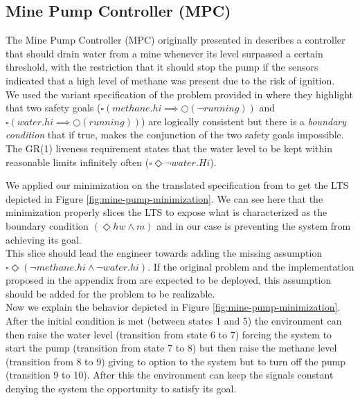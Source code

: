 \subsection{Mine Pump Controller (MPC)}
The Mine Pump Controller (MPC)
 originally presented in
\cite{:/content/journals/10.1049/ip-e.1983.0001} describes a controller that should
drain water from a mine whenever its level surpassed
a certain threshold, with the restriction that it should
stop the pump if the sensors indicated that a high level
of methane was present due to the risk of ignition.\\

We used the variant specification of the problem provided  in \cite{DBLP:conf/kbse/DegiovanniRACA16}
where they highlight that two safety goals ($\square(methane.hi \implies \Circle(\neg running))$
and $\square(water.hi \implies \Circle(running))$) are logically consistent but there is a \textit{boundary condition} 
that if true, makes the conjunction of the two safety goals impossible. The GR(1) liveness requirement states that the
 water level to be kept within reasonable limits infinitely often ($\square \Diamond \neg water.Hi$).


We applied our minimization on the translated specification from \cite{DBLP:conf/kbse/DegiovanniRACA16}
to get the LTS depicted in Figure
 \ref{fig:mine-pump-minimization}.  We can see here that
 the minimization properly slices the LTS to expose what
 is characterized
 as the boundary condition $(\Diamond hw \wedge m)$ and in our
 case is preventing the system from achieving its goal.
 \\

 
 This slice should lead the engineer towards adding
 the missing assumption $\square \Diamond (\neg methane.hi \wedge \neg water.hi)$.
 If the original problem and the implementation proposed in 
the appendix from \cite{:/content/journals/10.1049/ip-e.1983.0001}
are expected to be deployed, this assumption should be added for
the problem to be realizable.\\


Now we explain the behavior depicted in Figure \ref{fig:mine-pump-minimization}.
 After the initial condition is met (between states 1 and 
 5) the environment can then raise the water level (transition
 from state 6 to 7) forcing the system to start the pump
 (transition from state 7 to 8) but then raise the
 methane level (transition from 8 to 9) giving to option
 to the system but to turn off the pump (transition 9
 to 10).  After this the environment can keep the
 signals constant denying the system the opportunity
 to satisfy its goal.\\
 
